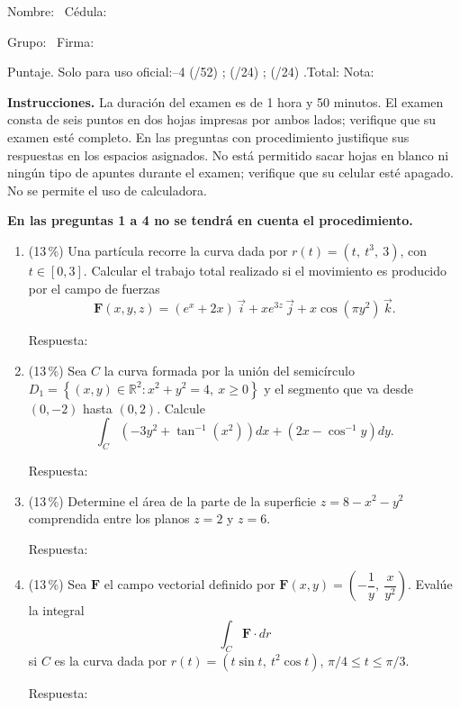 \documentclass[11pt]{article}
\begin{document}
\examheader

\vspace{4pt}
\noindent Nombre: \dotfill\ Cédula: \dotfill

\vspace{4pt}
\noindent Grupo: \dotfill\ Firma: \dotfill

\vspace{4pt}
\noindent Puntaje. Solo para uso oficial:--4 (/52) \dotfill; (/24) \dotfill; (/24) \dotfill.\quad Total: \dotfill\quad Nota: \dotfill

\vspace{6pt}
\noindent\textbf{Instrucciones.} La duración del examen es de 1 hora y 50 minutos. El examen consta de seis puntos en dos hojas impresas por ambos lados; verifique que su examen esté completo. En las preguntas con procedimiento justifique sus respuestas en los espacios asignados. No está permitido sacar hojas en blanco ni ningún tipo de apuntes durante el examen; verifique que su celular esté apagado. No se permite el uso de calculadora.

\vspace{8pt}
\noindent\textbf{En las preguntas 1 a 4 no se tendrá en cuenta el procedimiento.}

\begin{enumerate}
\item{} (13\,\%) Una partícula recorre la curva dada por $r(t) = (t,\ t^3,\ 3)$, con $t \in [0,3]$. Calcular el trabajo total realizado si el movimiento es producido por el campo de fuerzas
\[
\mathbf F(x,y,z) = (e^x + 2x)\,\vec i + xe^{3z}\,\vec j + x\cos(\pi y^2)\,\vec k.
\]

\vspace{2pt}
\noindent Respuesta: \underline{\phantom{XXXXXXXXXXXX}}

\item{} (13\,\%) Sea $C$ la curva formada por la unión del semicírculo $D_1 = \left\{(x,y)\in\mathbb{R}^2 : x^2 + y^2 = 4,\ x \geq 0\right\}$ y el segmento que va desde $(0,-2)$ hasta $(0,2)$. Calcule
\[
\int_C \left(-3y^2 + \tan^{-1}(x^2)\right)dx + \left(2x - \cos^{-1} y\right)dy.
\]

\vspace{2pt}
\noindent Respuesta: \underline{\phantom{XXXXXXXXXXXX}}

\item{} (13\,\%) Determine el área de la parte de la superficie $z = 8 - x^2 - y^2$ comprendida entre los planos $z = 2$ y $z = 6$.

\vspace{2pt}
\noindent Respuesta: \underline{\phantom{XXXXXXXXXXXX}}

\item{} (13\,\%) Sea $\mathbf F$ el campo vectorial definido por $\mathbf F(x,y) = \left(-\dfrac{1}{y},\ \dfrac{x}{y^2}\right)$. Evalúe la integral
\[
\int_C \mathbf F \cdot dr
\]
si $C$ es la curva dada por $r(t) = (t\sin t,\ t^2\cos t)$, $\pi/4 \leq t \leq \pi/3$.

\vspace{2pt}
\noindent Respuesta: \underline{\phantom{XXXXXXXXXXXX}}
\end{enumerate}
\end{document}
